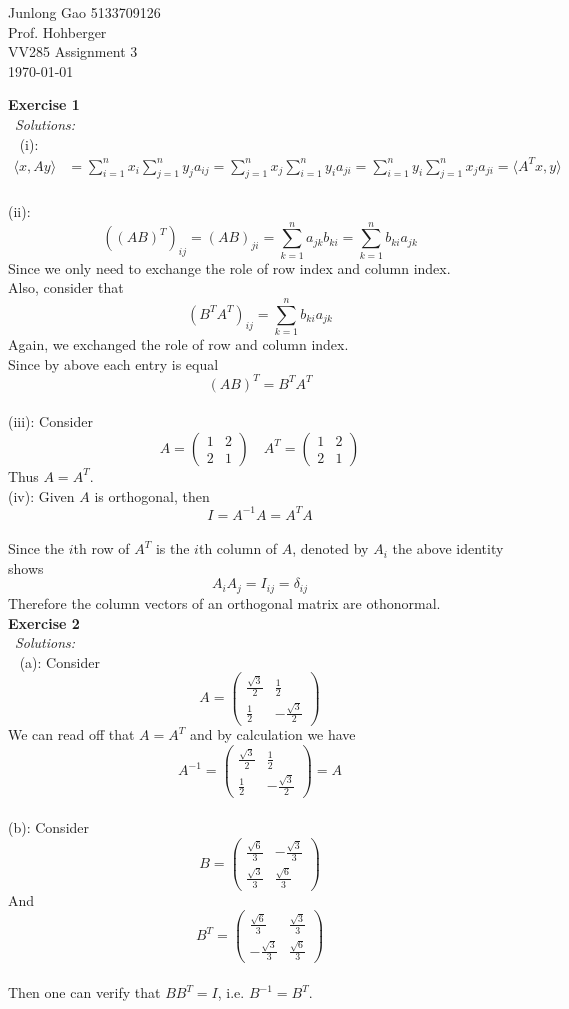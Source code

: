 \documentclass[12pt]{article}
\def\dotp#1#2{\langle#1,#2\rangle}
\def\ss#1#2{\sum_{#1=1}^{#2}}
\def\es#1#2{{\bf Exercise #1}\\~{\it Solutions:}\\~#2\\[1em]}
\def\inn#1#2{(#1): #2\\[0.5em]}
\def\ff#1#2{\frac{#1}{#2}}
\begin{document}
 
\begin{flushleft}
  Junlong Gao 5133709126\\ 
  Prof.  Hohberger\\ 
  VV285 Assignment 3\\
  \today 
\end{flushleft}

\es{1}{
	\inn{i}{
		\begin{align*}
		\dotp{x}{Ay}&=\ss{i}{n}x_i\ss{j}{n}y_ja_{ij}=\ss{j}{n}x_j\ss{i}{n}y_ia_{ji}=\ss{i}{n}y_i\ss{j}{n}x_ja_{ji}=\dotp{A^Tx}{y}
		\end{align*}
	}
	\inn{ii}{
		\[
		\left({(AB)}^T\right)_{ij}=\left(AB\right)_{ji}=\ss{k}{n}a_{jk}b_{ki}=\ss{k}{n}b_{ki}a_{jk}
		\]
		Since we only need to exchange the role of row index and column index.\\
		Also, consider that
		\[
		\left({B}^T\!{A}^T\right)_{ij}=\ss{k}{n}b_{ki}a_{jk}
		\]
		Again, we exchanged the role of row and column index.\\
		Since by above each entry is equal
		\[
		{(AB)}^T={B}^T\!{A}^T
		\]
		}
	\inn{iii}{
		Consider 
		\[
			A=\begin{pmatrix}
			1&2\\
			2&1
			\end{pmatrix}
			\quad
			A^T=\begin{pmatrix}
			1&2\\
			2&1
			\end{pmatrix}
		\]Thus $A=A^T$.
	}
	\inn{iv}{
		Given $A$ is orthogonal, then
		\[
		I=A^{-1}A=A^TA
		\]
		}
		Since the $i$th row of $A^T$ is the $i$th column of $A$, denoted by $A_i$ the above identity shows
		\[
		A_iA_j=I_{ij}=\delta_{ij}
		\]
		Therefore the column vectors of an orthogonal matrix  are othonormal.
}
\es{2}{
	\inn{a}{
		Consider
		\[
		A=\begin{pmatrix}
		\ff{\sqrt3}{2}&\ff{1}{2}\\
		\ff{1}{2}&-\ff{\sqrt3}{2}
		\end{pmatrix}
		\]
		We can read off that $A=A^T$ and by calculation we have 
		\[
		A^{-1}=\begin{pmatrix}
		\ff{\sqrt3}{2}&\ff{1}{2}\\
		\ff{1}{2}&-\ff{\sqrt3}{2}
		\end{pmatrix}=A
		\]
	}
	\inn{b}{
		Consider
		\[
		B=\begin{pmatrix}
		\ff{\sqrt6}{3}&-\ff{\sqrt3}{3}\\
		\ff{\sqrt3}{3}&\ff{\sqrt6}{3}
		\end{pmatrix}
		\]
		And 
		\[
		B^T=\begin{pmatrix}
		\ff{\sqrt6}{3}&\ff{\sqrt3}{3}\\
		-\ff{\sqrt3}{3}&\ff{\sqrt6}{3}
		\end{pmatrix}
		\]
		}
		Then one can verify that $BB^T=I$, i.e. $B^{-1}=B^T$.
}
\end{document}
